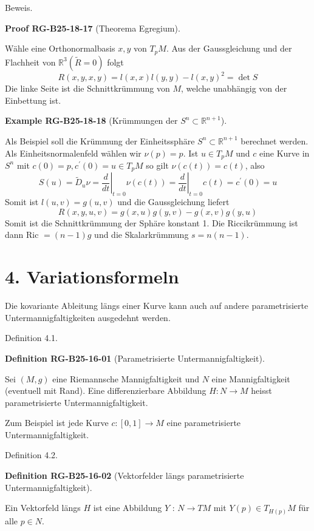 \documentclass[10pt, letterpaper]{article}
\newcommand{\R}{\mathbb{R}}
\newcommand{\CustomHeading}[3]{%
  \par\medskip\noindent%
  \textbf{#1 #2} \textnormal{(#3)}.\enskip%
}
\newenvironment{DEF}[2]{\begin{unitbox}\CustomHeading{Definition}{#1}{#2}}{\end{unitbox}}
\newenvironment{EXA}[2]{\begin{unitbox}\CustomHeading{Example}{#1}{#2}}{\end{unitbox}}
\newenvironment{PROOF}[2]{\begin{unitbox}\CustomHeading{Proof}{#1}{#2}}{\end{unitbox}}
\begin{document}
Beweis. 

\begin{PROOF}{RG-B25-18-17}{Theorema Egregium}
Wähle eine Orthonormalbasis $x, y$ von $T_{p} M$. Aus der Gaussgleichung und der Flachheit von $\mathbb{R}^{3}(\tilde{R}=0)$ folgt
$$
R(x, y, x, y)=l(x, x) l(y, y)-l(x, y)^{2}=\operatorname{det} S
$$
Die linke Seite ist die Schnittkrümmung von $M$, welche unabhängig von der Einbettung ist.
\end{PROOF}



\begin{EXA}{RG-B25-18-18}{Krümmungen der $S^n\subset\R^{n+1}$}
Als Beispiel soll die Krümmung der Einheitssphäre $S^{n} \subset \mathbb{R}^{n+1}$ berechnet werden. Als Einheitsnormalenfeld wählen wir $\nu(p)=p$. Ist $u \in T_{p} M$ und $c$ eine Kurve in $S^{n}$ mit $c(0)=p, c^{\prime}(0)=u \in T_{p} M$ so gilt $\nu(c(t))=c(t)$, also
$$
S(u)=\tilde{D}_{u} \nu=\left.\frac{d}{d t}\right|_{t=0} \nu(c(t))=\left.\frac{d}{d t}\right|_{t=0} c(t)=c^{\prime}(0)=u
$$
Somit ist $l(u, v)=g(u, v)$ und die Gaussgleichung liefert
$$
R(x, y, u, v)=g(x, u) g(y, v)-g(x, v) g(y, u)
$$
Somit ist die Schnittkrümmung der Sphäre konstant 1. Die Riccikrümmung ist dann Ric $=(n-1) g$ und die Skalarkrümmung $s=n(n-1)$.
\end{EXA}


\pagebreak


\section*{4. Variationsformeln}


Die kovariante Ableitung längs einer Kurve kann auch auf andere parametrisierte Untermannigfaltigkeiten ausgedehnt werden.

Definition 4.1. 

\begin{DEF}{RG-B25-16-01}{Parametrisierte Untermannigfaltigkeit}
Sei $(M, g)$ eine Riemannsche Mannigfaltigkeit und $N$ eine Mannigfaltigkeit (eventuell mit Rand). Eine differenzierbare Abbildung $H: N \rightarrow M$ heisst parametrisierte Untermannigfaltigkeit.
\end{DEF}


Zum Beispiel ist jede Kurve $c:[0,1] \rightarrow M$ eine parametrisierte Untermannigfaltigkeit.

Definition 4.2. 

\begin{DEF}{RG-B25-16-02}{Vektorfelder längs parametrisierte Untermannigfaltigkeit}
Ein Vektorfeld längs $H$ ist eine Abbildung $Y$ : $N \rightarrow T M$ mit $Y(p) \in T_{H(p)} M$ für alle $p \in N$.
\end{DEF}
\end{document}
